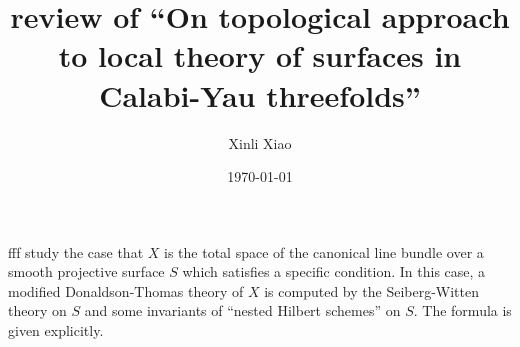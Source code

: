 \documentclass{amsart}
\title{review of ``On topological approach to local theory of surfaces in Calabi-Yau threefolds''}
\author{Xinli Xiao}
\date{\today}
\begin{document}
    
    \maketitle
    fff study the case that $X$ is the total space of the canonical line bundle over a smooth projective surface $S$ which satisfies a specific condition. In this case, a modified Donaldson-Thomas theory of $X$ is computed by the Seiberg-Witten theory on $S$ and some invariants of ``nested Hilbert schemes'' on $S$. The formula is given explicitly.
    
    
\end{document}

